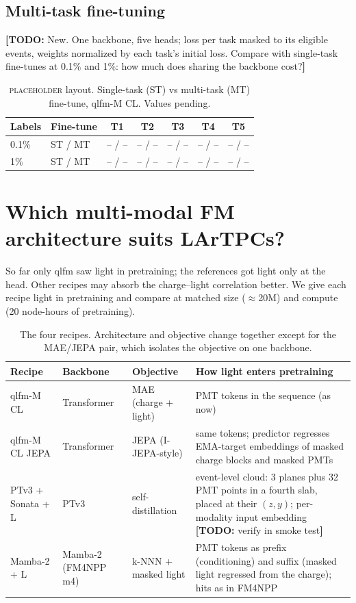 \documentclass[11pt,a4paper]{article}
\newcommand{\todo}[1]{{\color{plan}\textbf{[TODO:} #1\textbf{]}}}
\newcommand{\demo}{{\color{plan}\textsc{placeholder}}}
\begin{document}
\subsection{Multi-task fine-tuning}
\todo{New. One backbone, five heads; loss per task masked to its eligible events, weights normalized by each task's initial loss. Compare with single-task fine-tunes at 0.1\% and 1\%: how much does sharing the backbone cost?}
\begin{table}[H]\centering\small
\caption{\demo{} layout. Single-task (ST) vs multi-task (MT) fine-tune, qlfm-M CL. {\color{plan}Values pending.}}\label{tab:mt}
\begin{tabular}{llccccc}\toprule
Labels & Fine-tune & T1 & T2 & T3 & T4 & T5\\\midrule
0.1\% & ST / MT & -- / -- & -- / -- & -- / -- & -- / -- & -- / --\\
1\% & ST / MT & -- / -- & -- / -- & -- / -- & -- / -- & -- / --\\
\bottomrule\end{tabular}
\end{table}

\section{Which multi-modal FM architecture suits LArTPCs?}\label{sec:arch}
So far only qlfm saw light in pretraining; the references got light only at the head. Other recipes may absorb the charge--light correlation better. We give each recipe light in pretraining and compare at matched size ($\approx$20M) and compute (20 node-hours of pretraining).

\begin{table}[H]\centering\footnotesize
\caption{The four recipes. Architecture and objective change together except for the MAE/JEPA pair, which isolates the objective on one backbone.}\label{tab:recipes}
\begin{tabularx}{\textwidth}{lllL}\toprule
Recipe & Backbone & Objective & How light enters pretraining\\\midrule
qlfm-M CL & Transformer & MAE (charge + light) & PMT tokens in the sequence (as now)\\
qlfm-M CL JEPA & Transformer & JEPA (I-JEPA-style) & same tokens; predictor regresses EMA-target embeddings of masked charge blocks and masked PMTs\\
PTv3 + Sonata + L & PTv3 & self-distillation & event-level cloud: 3 planes plus 32 PMT points in a fourth slab, placed at their $(z,y)$; per-modality input embedding \todo{verify in smoke test}\\
Mamba-2 + L & Mamba-2 (FM4NPP m4) & k-NNN + masked light & PMT tokens as prefix (conditioning) and suffix (masked light regressed from the charge); hits as in FM4NPP\\
\bottomrule\end{tabularx}
\end{table}
\end{document}
